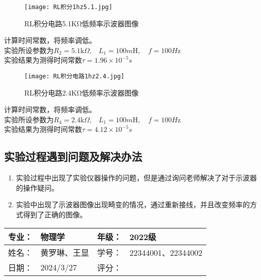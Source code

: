 \documentclass[dvipsnames, svgnames,a4paper,11pt]{article}
\begin{document}
\begin{enumerate}
\begin{figure}[{H}]
	\centering
	\texttt{[image: RL积分1hz5.1.jpg]}
	\caption{RL积分电路5.1KΩ低频率示波器图像}
	\label{}
\end{figure}
计算时间常数，将频率调低。\\
实验所设参数为$R_2=5.1\text{k}\Omega\text{,}\quad L_1=100m\text{H},\quad f=100H\text{z}$\\
实验结果为测得时间常数$\tau=1.96 \times 10^{-5}s$


\begin{figure}[{H}]
	\centering
	\texttt{[image: RL积分电路1hz2.4.jpg]}
	\caption{RL积分电路2.4KΩ低频率示波器图像}
	\label{}
\end{figure}
计算时间常数，将频率调低。\\
实验所设参数为$R_4=2.4\text{k}\Omega\text{,}\quad L_1=100m\text{H},\quad f=100H\text{z}$\\
实验结果为测得时间常数$\tau=4.12 \times 10^{-5}s$


	\end{enumerate}
	
	

	\subsection{实验过程遇到问题及解决办法}
	\begin{enumerate}
		\item 实验过程中出现了实验仪器操作的问题，但是通过询问老师解决了对于示波器的操作疑问。
		\item 实验中出现了示波器图像出现畸变的情况，通过重新接线，并且改变频率的方式得到了正确的图像。
		
	\end{enumerate}
	
	
	
	\clearpage
	
	\begin{table}
		\renewcommand\arraystretch{1.7}
		\begin{tabularx}{\textwidth}{|X|X|X|X|}
			\hline
			专业：& 物理学 &年级：& 2022级\\
			\hline
			姓名： & 黄罗琳、王显 & 学号：& 22344001、22344002\\
			\hline
			日期：& 2024/3/27 & 评分： &\\
			\hline
		\end{tabularx}
	\end{table}
	
\end{document}
